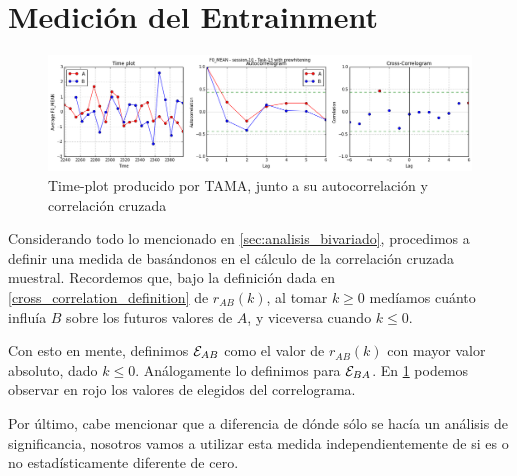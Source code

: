 \section{Medición del Entrainment}
\label{sec:method_entrainment}

\begin{figure}
\centering
\includegraphics[width=15cm]{images/time_plot_with_cross_correlation.png}
\caption{Time-plot producido por TAMA, junto a su autocorrelación y correlación cruzada\label{fig:time_plot_with_bivariate}}
\end{figure}

Considerando todo lo mencionado en \ref{sec:analisis_bivariado}, procedimos a definir una medida de \entrainment basándonos en el cálculo de la correlación cruzada muestral. Recordemos que, bajo la definición dada en \ref{cross_correlation_definition} de $r_{AB}(k)$, al tomar $k \geq 0$ medíamos cuánto influía $B$ sobre los futuros valores de $A$, y viceversa cuando $k \leq 0$.

Con esto en mente, definimos $\mathcal{E}_{AB}$ como el valor de $r_{AB}(k)$ con mayor valor absoluto, dado $k \leq 0$. Análogamente lo definimos para $\mathcal{E}_{BA}$. En \ref{fig:time_plot_with_bivariate} podemos observar en rojo los valores de \entrainment elegidos del correlograma.

Por último, cabe mencionar que a diferencia de \cite{KOU2008.2} dónde sólo se hacía un análisis de significancia, nosotros vamos a utilizar esta medida independientemente de si es o no estadísticamente diferente de cero.
